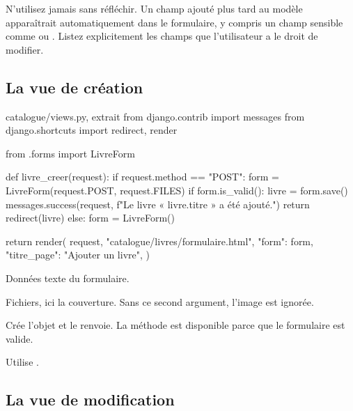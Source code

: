 \begin{attention}
N'utilisez jamais  sans réfléchir. Un champ ajouté plus
tard au modèle apparaîtrait automatiquement dans le formulaire, y compris un champ
sensible comme  ou . Listez explicitement les champs
que l'utilisateur a le droit de modifier.
\end{attention}

\subsection{La vue de création}

\begin{codebox}[python]{catalogue/views.py, extrait}
from django.contrib import messages
from django.shortcuts import redirect, render

from .forms import LivreForm


def livre_creer(request):
    if request.method == "POST":
        form = LivreForm(request.POST, request.FILES)
        if form.is_valid():
            livre = form.save()
            messages.success(request, f"Le livre « {livre.titre} » a été ajouté.")
            return redirect(livre)
    else:
        form = LivreForm()

    return render(
        request,
        "catalogue/livres/formulaire.html",
        {"form": form, "titre_page": "Ajouter un livre"},
    )
\end{codebox}

\begin{description}[leftmargin=4.3cm,style=nextline]
  \item[\code{request.POST}] Données texte du formulaire.
  \item[\code{request.FILES}] Fichiers, ici la couverture. Sans ce second argument,
  l'image est ignorée.
  \item[\code{form.save()}] Crée l'objet et le renvoie. La méthode est disponible
  parce que le formulaire est valide.
  \item[\code{redirect(livre)}] Utilise .
\end{description}

\subsection{La vue de modification}

